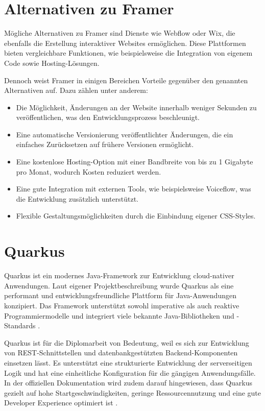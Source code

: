\setauthor{\firstauthor}
\section{Alternativen zu Framer}
Mögliche Alternativen zu Framer sind Dienste wie Webflow oder Wix,
die ebenfalls die Erstellung interaktiver Websites ermöglichen.
Diese Plattformen bieten vergleichbare Funktionen, 
wie beispielsweise die Integration von eigenem Code sowie Hosting-Lösungen.

Dennoch weist Framer in einigen Bereichen Vorteile gegenüber den genannten
Alternativen auf. Dazu zählen unter anderem:
\begin{itemize}
    \item Die Möglichkeit, Änderungen an der Website innerhalb 
    weniger Sekunden zu veröffentlichen, was den Entwicklungsprozess 
    beschleunigt.
    \item Eine automatische Versionierung veröffentlichter Änderungen, 
    die ein einfaches Zurücksetzen auf frühere Versionen ermöglicht.
    \item Eine kostenlose Hosting-Option mit einer Bandbreite von 
    bis zu 1 Gigabyte pro Monat, wodurch Kosten reduziert werden.
    \item Eine gute Integration mit externen Tools, wie beispielsweise 
    Voiceflow, was die Entwicklung zusätzlich unterstützt.
    \item Flexible Gestaltungsmöglichkeiten durch die Einbindung 
    eigener CSS-Styles.
\end{itemize}

\setauthor{\secondauthor}
\section{Quarkus}

Quarkus ist ein modernes Java-Framework zur Entwicklung cloud-nativer Anwendungen.
Laut eigener Projektbeschreibung wurde Quarkus als eine performant und 
entwicklungsfreundliche Plattform für Java-Anwendungen konzipiert. Das Framework 
unterstützt sowohl imperative als auch reaktive Programmiermodelle und integriert 
viele bekannte Java-Bibliotheken und -Standards \cite{QuarkusAbout,QuarkusHome}.

Quarkus ist für die Diplomarbeit von Bedeutung, weil es sich zur Entwicklung von 
REST-Schnittstellen und datenbankgestützten Backend-Komponenten einsetzen lässt. 
Es unterstützt eine strukturierte Entwicklung der serverseitigen Logik und hat 
eine einheitliche Konfiguration für die gängigen Anwendungsfälle. In der 
offiziellen Dokumentation wird zudem darauf hingewiesen, dass Quarkus gezielt auf 
hohe Startgeschwindigkeiten, geringe Ressourcennutzung und eine gute Developer 
Experience optimiert ist \cite{QuarkusAbout,QuarkusHome}.

